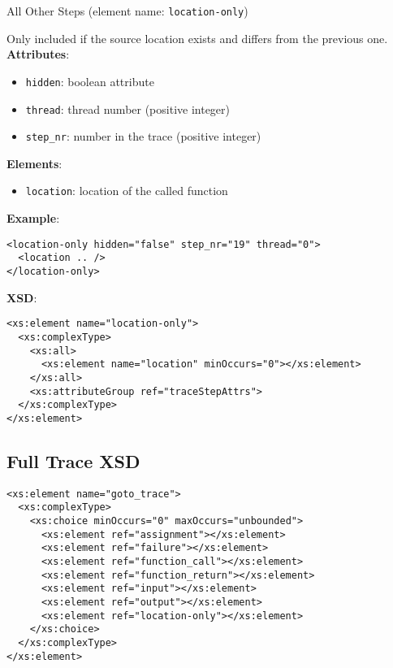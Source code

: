 \documentclass[12pt]{article}
\begin{document}
\hrulefill

\begin{center}
  {\Large All Other Steps} (element name: \texttt{location-only})
\end{center}

\noindent Only included if the source location exists and differs from the previous one.\\

\noindent\textbf{Attributes}:
\begin{itemize}
\item \texttt{hidden}: boolean attribute
\item \texttt{thread}: thread number (positive integer)
\item \texttt{step\_nr}: number in the trace (positive integer)
\end{itemize}

\noindent\textbf{Elements}:
\begin{itemize}
\item \texttt{location}: location of the called function
\end{itemize}

\noindent\textbf{Example}:
\begin{verbatim}
<location-only hidden="false" step_nr="19" thread="0">
  <location .. />
</location-only>
\end{verbatim}

\noindent\textbf{XSD}:
\begin{verbatim}
<xs:element name="location-only">
  <xs:complexType>
    <xs:all>
      <xs:element name="location" minOccurs="0"></xs:element>
    </xs:all>
    <xs:attributeGroup ref="traceStepAttrs">
  </xs:complexType>
</xs:element>
\end{verbatim}

\subsection{Full Trace XSD}

\begin{verbatim}
<xs:element name="goto_trace">
  <xs:complexType>
    <xs:choice minOccurs="0" maxOccurs="unbounded">
      <xs:element ref="assignment"></xs:element>
      <xs:element ref="failure"></xs:element>
      <xs:element ref="function_call"></xs:element>
      <xs:element ref="function_return"></xs:element>
      <xs:element ref="input"></xs:element>
      <xs:element ref="output"></xs:element>
      <xs:element ref="location-only"></xs:element>
    </xs:choice>
  </xs:complexType>
</xs:element>
\end{verbatim}
\end{document}

